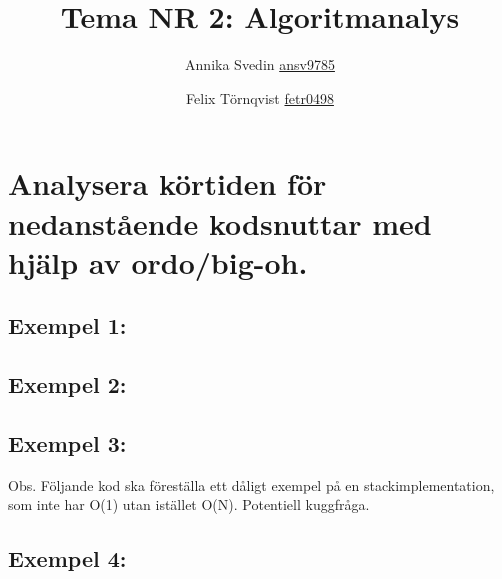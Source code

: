 \documentclass[a5paper,10pt,oneside]{article}
\title{Tema NR 2: Algoritmanalys}
\author{Annika Svedin \url{ansv9785} \and Felix Törnqvist \url{fetr0498}}
\begin{document}
\maketitle
\section*{Analysera körtiden för nedanstående kodsnuttar med hjälp av ordo/big-oh.}

\subsection*{Exempel 1:}




\subsection*{Exempel 2:}



\subsection*{Exempel 3:}
Obs. 
Följande kod ska föreställa ett dåligt exempel på en stackimplementation, som inte har O(1) utan istället O(N). Potentiell kuggfråga.



\subsection*{Exempel 4:}

\end{document}
